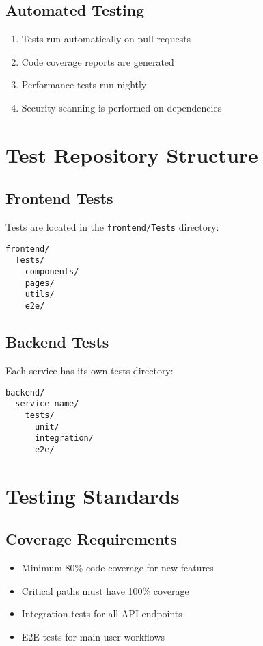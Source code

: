 \documentclass[12pt]{article}
\begin{document}
\subsection{Automated Testing}
\begin{enumerate}
    \item Tests run automatically on pull requests
    \item Code coverage reports are generated
    \item Performance tests run nightly
    \item Security scanning is performed on dependencies
\end{enumerate}

\section{Test Repository Structure}

\subsection{Frontend Tests}
Tests are located in the \texttt{frontend/Tests} directory:
\begin{lstlisting}[frame=single]
frontend/
  Tests/
    components/
    pages/
    utils/
    e2e/
\end{lstlisting}

\subsection{Backend Tests}
Each service has its own tests directory:
\begin{lstlisting}[frame=single]
backend/
  service-name/
    tests/
      unit/
      integration/
      e2e/
\end{lstlisting}

\section{Testing Standards}

\subsection{Coverage Requirements}
\begin{itemize}
    \item Minimum 80\% code coverage for new features
    \item Critical paths must have 100\% coverage
    \item Integration tests for all API endpoints
    \item E2E tests for main user workflows
\end{itemize}
\end{document}
